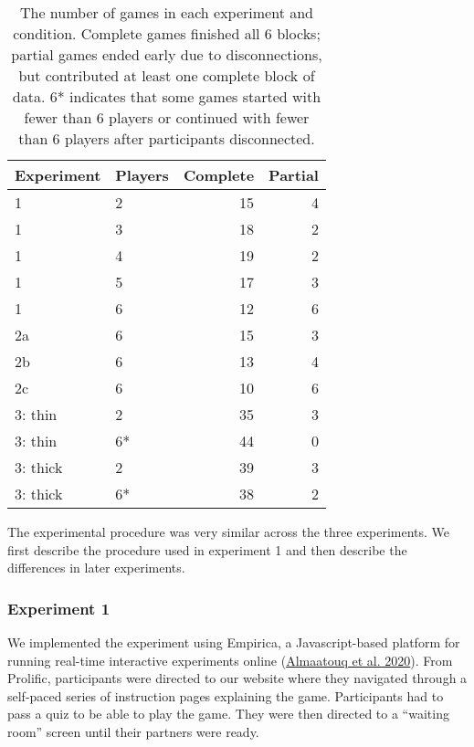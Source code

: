 \documentclass[
  english,
  a4paper,
]{article}
\begin{document}
\begin{table}

\caption{\label{tab:participants}The number of games in each experiment and condition. Complete games finished all 6 blocks; partial games ended early due to disconnections, but contributed at least one complete block of data. 6* indicates that some games started with fewer than 6 players or continued with fewer than 6 players after participants disconnected.}
\centering
\begin{tabular}[t]{l|l|r|r}
\hline
Experiment & Players & Complete & Partial\\
\hline
1 & 2 & 15 & 4\\
\hline
1 & 3 & 18 & 2\\
\hline
1 & 4 & 19 & 2\\
\hline
1 & 5 & 17 & 3\\
\hline
1 & 6 & 12 & 6\\
\hline
2a & 6 & 15 & 3\\
\hline
2b & 6 & 13 & 4\\
\hline
2c & 6 & 10 & 6\\
\hline
3: thin & 2 & 35 & 3\\
\hline
3: thin & 6* & 44 & 0\\
\hline
3: thick & 2 & 39 & 3\\
\hline
3: thick & 6* & 38 & 2\\
\hline
\end{tabular}
\end{table}

The experimental procedure was very similar across the three experiments. We first describe the procedure used in experiment 1 and then describe the differences in later experiments.

\hypertarget{experiment-1}{%
\subsubsection{Experiment 1}\label{experiment-1}}

We implemented the experiment using Empirica, a Javascript-based platform for running real-time interactive experiments online (\protect\hyperlink{ref-almaatouqEmpiricaVirtualLab2020}{Almaatouq et al. 2020}). From Prolific, participants were directed to our website where they navigated through a self-paced series of instruction pages explaining the game. Participants had to pass a quiz to be able to play the game. They were then directed to a ``waiting room'' screen until their partners were ready.
\end{document}
